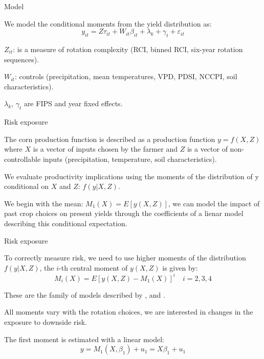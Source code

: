 \documentclass[notes,11pt, aspectratio=169]{beamer}
\newenvironment{wideitemize}{\itemize\addtolength{\itemsep}{10pt}}{\enditemize}
\begin{document}
\begin{frame}{Model}
    \begin{wideitemize}
        \item We model the conditional moments from the yield distribution as:
        \begin{equation*}
            y_{it}=Z\tau_{it}+W_{it}\beta_{it}+\lambda_{k}+\gamma_{t}+\varepsilon_{it}
        \end{equation*}
        \item $Z_{it}$: is a measure of rotation complexity (RCI, binned RCI, six-year rotation sequences).
        \item $W_{it}$: controls (precipitation, mean temperatures, VPD, PDSI, NCCPI, soil characteristics).
        \item $\lambda_{k}$, $\gamma_{t}$ are FIPS and year fixed effects.
    \end{wideitemize}
\end{frame}


\begin{frame}{Risk exposure}
\begin{wideitemize}
    \item The corn production function is described as a production function $y=f(X,Z)$ where $X$ is a vector of inputs chosen by the farmer and $Z$ is a vector of non-controllable inputs (precipitation, temperature, soil characteristics).
    \item We evaluate productivity implications using the moments of the distribution of y conditional on $X$ and $Z$: $f(y|X,Z)$.
    \item We begin with the mean: $M_{1}(X)=E\left[y(X,Z)\right]$, we can model the impact of past crop choices on present yields through the coefficients of a lienar model describing this conditional expectation.
    \end{wideitemize}
\end{frame}

\begin{frame}{Risk exposure}
\begin{wideitemize}
    \item To correctly measure risk, we need to use higher moments of the distribution $f(y|X,Z)$, the $i$-th central moment of $y(X,Z)$ is given by:
    \begin{equation*}
        M_{i}(X)=E\left[y(X,Z)-M_{1}(X)\right]^{i}\quad i=2,3,4
    \end{equation*}
    \item These are the family of models described by \cite{antle1983}, \cite{shi2013} and \cite{li2021}.
    \item All moments vary with the rotation choices, we are interested in changes in the exposure to downside risk.
    \item The first moment is estimated with a linear model: 
    \begin{equation*}
        y = M_{1}(X,\beta_{1})+u_{1}=X\beta_{1}+u_{1}
    \end{equation*}
    \end{wideitemize}
\end{frame}
\end{document}

